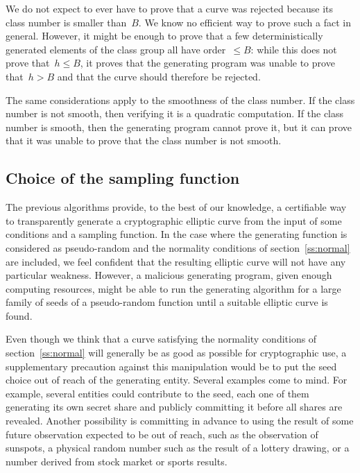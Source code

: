 \documentclass[twocolumn,letterpaper]{article}
\begin{document}
We do not expect to ever have to prove that a curve was rejected
because its class number is smaller than~$B$.
We know no efficient way to prove such a fact in general.
However, it might be enough to prove
that a few deterministically generated elements of the class group
all have order~$≤ B$:
while this does not prove that~$h ≤ B$,
it proves that the generating program was unable to prove that~$h > B$
and that the curve should therefore be rejected.

\smallskip

The same considerations apply to the smoothness of the class number.
If the class number is not smooth, then
verifying it is a quadratic computation.
If the class number is smooth, then
the generating program cannot prove it,
but it can prove that it was unable to prove that
the class number is not smooth.




\subsection{Choice of the sampling function}

The previous algorithms provide, to the best of our knowledge,
a certifiable way to transparently generate a cryptographic elliptic curve
from the input of some conditions and a sampling function.
In the case where the generating function is considered as pseudo-random
and the normality conditions of section~\ref{ss:normal} are included,
we feel confident that the resulting elliptic curve
will not have any particular weakness.
However, a malicious generating program, given enough computing resources,
might be able to run the generating algorithm
for a large family of seeds of a pseudo-random function
until a suitable elliptic curve is found.

Even though we think that a curve satisfying the normality conditions
of section~\ref{ss:normal} will generally be as good as possible
for cryptographic use,
a supplementary precaution against this manipulation
would be to put the seed choice out of reach of the generating entity.
Several examples come to mind.
For example, several entities could contribute to the seed,
each one of them generating its own secret share
and publicly committing it before all shares are revealed.
Another possibility is committing in advance to using
the result of some future observation expected to be out of reach,
such as the observation of sunspots,
a physical random number such as the result of a lottery drawing,
or a number derived from stock market or sports results.
\end{document}
